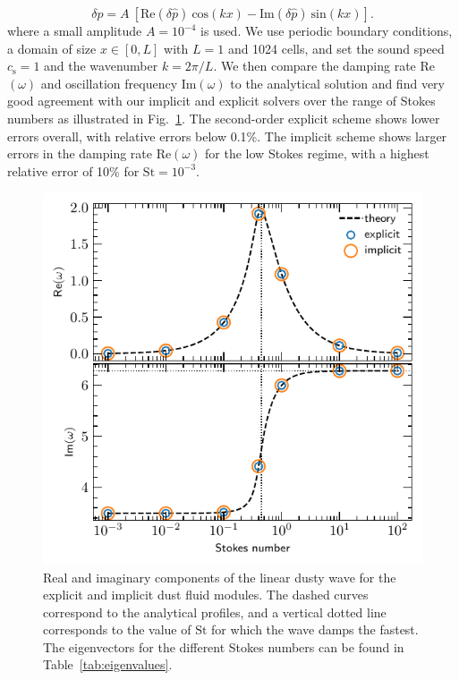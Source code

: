 \documentclass[fleqn,usenatbib,useAMS]{mnras}
\newcommand{\cs}{c_\mathrm{s}}
\newcommand{\St}{\mathrm{St}}
\begin{document}
\begin{equation}
    \label{eq:perturbation}
    \delta p = A~[\text{Re}(\delta\hat{p})~\text{cos}(kx) -\text{Im}(\delta\hat{p})~\text{sin}(kx)].
\end{equation}
where a small amplitude $A = 10^{-4}$ is used. We use periodic boundary conditions, a domain of size $x \in [0, L]$ with $L = 1$ and 1024 cells, and set the sound speed $\cs = 1$ and the wavenumber $k=2\pi/L$. We then compare the damping rate Re$(\omega)$ and oscillation frequency Im$(\omega)$ to the analytical solution and find very good agreement with our implicit and explicit solvers over the range of Stokes numbers as illustrated in Fig.~\ref{fig:dg-coupling}. The second-order explicit scheme shows lower errors overall, with relative errors below 0.1\%. The implicit scheme shows larger errors in the damping rate $\text{Re}(\omega)$ for the low Stokes regime, with a highest relative error of 10\% for $\St = 10^{-3}$. %

\begin{figure}
	\centering
	\includegraphics[width=\columnwidth]{dg-coupling.pdf}
	\caption{Real and imaginary components of the linear dusty wave for the explicit and implicit dust fluid modules. The dashed curves correspond to the analytical profiles, and a vertical dotted line corresponds to the value of $\St$ for which the wave damps the fastest. The eigenvectors for the different Stokes numbers can be found in Table~\ref{tab:eigenvalues}.}
	\label{fig:dg-coupling}
\end{figure}
\end{document}
